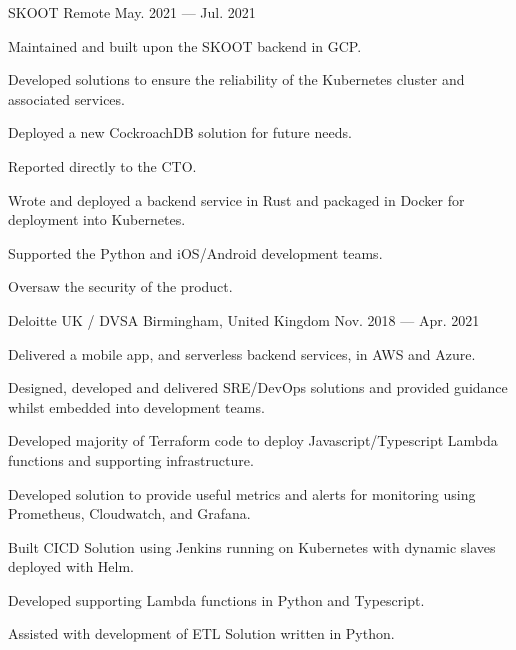 \begin{cventries}
    {SKOOT}
    {Remote}
    {May. 2021 — Jul. 2021}
    {
        \begin{cvitems}
            \item{Maintained and built upon the SKOOT backend in GCP.}
            \item{Developed solutions to ensure the reliability of the Kubernetes cluster and associated services.}
	    \item{Deployed a new CockroachDB solution for future needs.}
            \item{Reported directly to the CTO.}
            \item{Wrote and deployed a backend service in Rust and packaged in Docker for deployment into Kubernetes.}
            \item{Supported the Python and iOS/Android development teams.}
            \item{Oversaw the security of the product.}
        \end{cvitems}
    }

    {Deloitte UK / DVSA}
    {Birmingham, United Kingdom}
    {Nov. 2018 — Apr. 2021}
    {
        \begin{cvitems}
            \item{Delivered a mobile app, and serverless backend services, in AWS and Azure.}
            \item{Designed, developed and delivered SRE/DevOps solutions and provided guidance whilst embedded into development teams.}
            \item{Developed majority of Terraform code to deploy Javascript/Typescript Lambda functions and supporting infrastructure.}
            \item{Developed solution to provide useful metrics and alerts for monitoring using Prometheus, Cloudwatch, and Grafana.}
            \item{Built CICD Solution using Jenkins running on Kubernetes with dynamic slaves deployed with Helm.}
            \item{Developed supporting Lambda functions in Python and Typescript.}
            \item{Assisted with development of ETL Solution written in Python.}
        \end{cvitems}
    }


\end{cventries}
